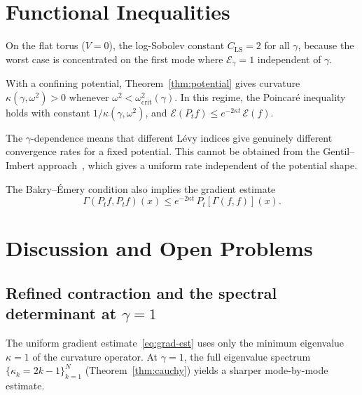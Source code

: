 \documentclass[11pt,a4paper]{article}
\theoremstyle{plain}
\theoremstyle{definition}
\theoremstyle{remark}
\begin{document}
\section{Functional Inequalities}\label{sec:func-ineq}

On the flat torus ($V = 0$), the log-Sobolev constant
$C_{\mathrm{LS}} = 2$ for all $\gamma$, because the worst case
is concentrated on the first mode where
$\mathcal{E}_\gamma = 1$ independent of $\gamma$.

With a confining potential, Theorem~\ref{thm:potential} gives
curvature $\kappa(\gamma,\omega^2) > 0$ whenever
$\omega^2 < \omega^2_{\mathrm{crit}}(\gamma)$.
In this regime, the Poincar\'e inequality holds with constant
$1/\kappa(\gamma,\omega^2)$, and
$\mathcal{E}(P_t f) \leq e^{-2\kappa t}\,\mathcal{E}(f)$.

The $\gamma$-dependence means that different L\'evy indices give
genuinely different convergence rates for a fixed potential.
This cannot be obtained from the
Gentil--Imbert approach~\cite{GentilImbert2008}, which gives
a uniform rate independent of the potential shape.

The Bakry--\'Emery condition also implies the gradient estimate
\begin{equation}\label{eq:grad-est}
  \Gamma(P_t f, P_t f)(x) \leq e^{-2\kappa t}\,P_t[\Gamma(f,f)](x).
\end{equation}


\section{Discussion and Open Problems}\label{sec:discussion}

\subsection{Refined contraction and the spectral determinant at $\gamma = 1$}

The uniform gradient estimate~\eqref{eq:grad-est} uses only
the minimum eigenvalue $\kappa = 1$ of the curvature operator.
At $\gamma = 1$, the full eigenvalue spectrum
$\{\kappa_k = 2k-1\}_{k=1}^N$ (Theorem~\ref{thm:cauchy})
yields a sharper mode-by-mode estimate.
\end{document}
